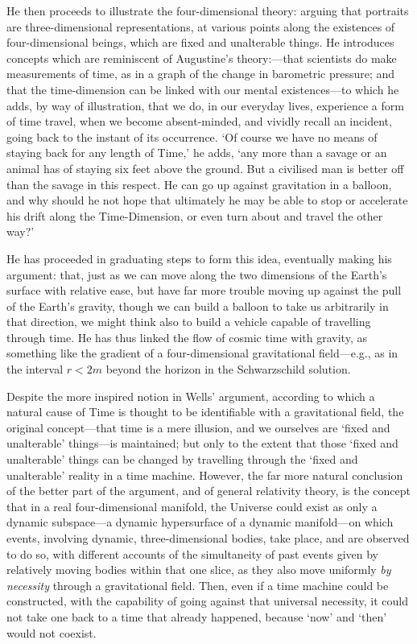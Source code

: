 He then proceeds to illustrate the four-dimensional theory: arguing that portraits are three-dimensional representations, at various points along the existences of four-dimensional beings, which are fixed and unalterable things. He introduces concepts which are reminiscent of Augustine's theory:---that scientists do make measurements of time, as in a graph of the change in barometric pressure; and that the time-dimension can be linked with our mental existences---to which he adds, by way of illustration, that we do, in our everyday lives, experience a form of time travel, when we become absent-minded, and vividly recall an incident, going back to the instant of its occurrence. `Of course we have no means of staying back for any length of Time,' he adds, `any more than a savage or an animal has of staying six feet above the ground. But a civilised man is better off than the savage in this respect. He can go up against gravitation in a balloon, and why should he not hope that ultimately he may be able to stop or accelerate his drift along the Time-Dimension, or even turn about and travel the other way?'

He has proceeded in graduating steps to form this idea, eventually making his argument: that, just as we can move along the two dimensions of the Earth's surface with relative ease, but have far more trouble moving up against the pull of the Earth's gravity, though we can build a balloon to take us arbitrarily in that direction, we might think also to build a vehicle capable of travelling through time. He has thus linked the flow of cosmic time with gravity, as something like the gradient of a four-dimensional gravitational field---e.g., as in the interval $r<2m$ beyond the horizon in the Schwarzschild solution.

Despite the more inspired notion in Wells' argument, according to which a natural cause of Time is thought to be identifiable with a gravitational field, the original concept---that time is a mere illusion, and we ourselves are `fixed and unalterable' things---is maintained; but only to the extent that those `fixed and unalterable' things can be changed by travelling through the `fixed and unalterable' reality in a time machine. However, the far more natural conclusion of the better part of the argument, and of general relativity theory, is the concept that in a real four-dimensional manifold, the Universe could exist as only a dynamic subspace---a dynamic hypersurface of a dynamic manifold---on which events, involving dynamic, three-dimensional bodies, take place, and are observed to do so, with different accounts of the simultaneity of past events given by relatively moving bodies within that one slice, as they also move uniformly \textit{by necessity} through a gravitational field. Then, even if a time machine could be constructed, with the capability of going against that universal necessity, it could not take one back to a time that already happened, because `now' and `then' would not coexist. 

